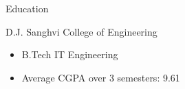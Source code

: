 \documentclass{article}
\newlength{\tabin}
\newlength{\secsep}
\newcommand{\lineunder}{\vspace*{-8pt} \\ \hspace*{-6pt} \hrulefill \\ \vspace*{-15pt}}
\newenvironment{tabbedsection}[1]{
  \begin{list}{}{
      \setlength{\itemsep}{0pt}
      \setlength{\labelsep}{0pt}
      \setlength{\labelwidth}{0pt}
      \setlength{\leftmargin}{\tabin}
      \setlength{\rightmargin}{\tabin}
      \setlength{\listparindent}{0pt}
      \setlength{\parsep}{0pt}
      \setlength{\parskip}{0pt}
      \setlength{\partopsep}{0pt}
      \setlength{\topsep}{#1}
    }
  \item[]
}{\end{list}}
\newenvironment{resume_section}[1]{
  \filbreak
  \vspace{2\secsep}
  \textsc{\large#1}
  \lineunder
  \begin{tabbedsection}{\secsep}
}{\end{tabbedsection}}
\newenvironment{resume_subsection}[2][]{
  \textbf{#2} \hfill {\footnotesize #1} \hspace{2em}
  \begin{tabbedsection}{0.5\secsep}
}{\end{tabbedsection}}
\newenvironment{subitems}{
  \renewcommand{\labelitemi}{-}
  \begin{itemize}
      \setlength{\labelsep}{1em}
}{\end{itemize}}
\begin{document}
\begin{resume_section}{Education}
    \begin{resume_subsection}[2019 - 2023 (expected)]{D.J. Sanghvi College of Engineering}
        \begin{subitems}
            \item B.Tech IT Engineering
            \item Average CGPA over 3 semesters: 9.61
        \end{subitems}
  \end{resume_subsection}
\end{resume_section}

\vspace{1cm}
\end{document}

